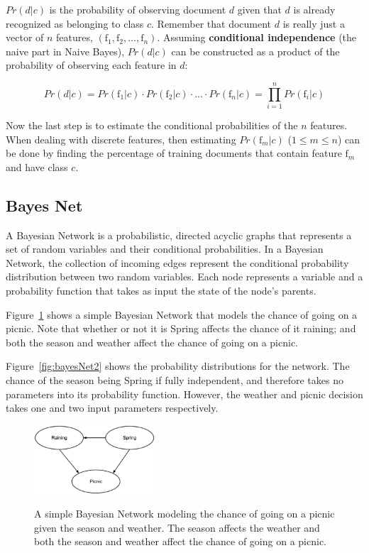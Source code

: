 \documentclass[12pt]{ucthesis}
\newcommand{\captionfonts}{\small\bf\ssp}
\begin{document}
$Pr(d|c)$ is the probability of observing document $d$ given that $d$ is already recognized as belonging to
class $c$. Remember that document $d$ is really just a vector of $n$ features, $(\textrm{f}_{1}, \textrm{f}_{2}, ..., \textrm{f}_{n})$.
Assuming \textbf{conditional independence} (the \textsf{naive} part in Naive Bayes), $Pr(d|c)$ can be
constructed as a product of the probability of observing each feature in $d$:

\begin{equation}
   Pr(d|c) = Pr(\textrm{f}_{1}|c) \cdot Pr(\textrm{f}_{2}|c) \cdot ... \cdot Pr(\textrm{f}_{n}|c) = \prod_{i = 1}^{n}Pr(\textrm{f}_{i}|c)
\end{equation}

Now the last step is to estimate the conditional probabilities of the $n$ features.
When dealing with discrete features, then estimating $Pr(\textrm{f}_{m}|c)$ ($1 \leq m \leq n$) can be done by
finding the percentage of training documents that contain feature $\textrm{f}_{m}$ and have class $c$.

\subsection{Bayes Net}
\label{background-classifiers-bayes-net}
A Bayesian Network is a probabilistic, directed acyclic graphs that represents a set of random variables and their conditional probabilities.
In a Bayesian Network, the collection of incoming edges represent the conditional probability distribution between two random variables.
Each node represents a variable and a probability function that takes as input the state of the node's parents.\cite{Pearl}\cite{Neapolitan}

Figure~\ref{fig:bayesNet1} shows a simple Bayesian Network that models the chance of going on a picnic.
Note that whether or not it is Spring affects the chance of it raining; and both the season and weather
affect the chance of going on a picnic.

Figure~\ref{fig:bayesNet2} shows the probability distributions for the network. The chance of the season being Spring if
fully independent, and therefore takes no parameters into its probability function. However, the weather and picnic decision
takes one and two input parameters respectively.

\begin{figure}
   \begin{center}
      \includegraphics[width=0.4\textwidth]{images/Bayes_Net_1.eps}
      \captionfonts
      \caption[Simple Bayes Net]{A simple Bayesian Network modeling the chance of going on a picnic given the season and weather. The season affects the weather and both the season and weather affect the chance of going on a picnic.}
      \label{fig:bayesNet1}
   \end{center}
\end{figure}
\end{document}
